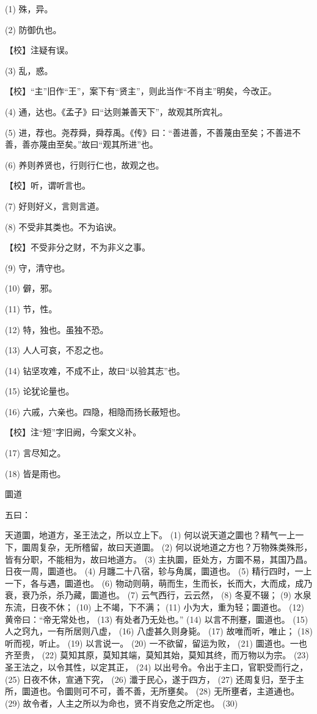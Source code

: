 \documentclass[12pt,UTF8]{ctexbook}
\begin{document}
(1) 殊，异。

(2) 防御仇也。

【校】注疑有误。

(3) 乱，惑。

【校】“主”旧作“王”，案下有“贤主”，则此当作“不肖主”明矣，今改正。

(4) 通，达也。《孟子》曰“达则兼善天下”，故观其所宾礼。

(5) 进，荐也。尧荐舜，舜荐禹。《传》曰：“善进善，不善蔑由至矣；不善进不善，善亦蔑由至矣。”故曰“观其所进”也。

(6) 养则养贤也，行则行仁也，故观之也。

【校】听，谓听言也。

(7) 好则好义，言则言道。

(8) 不受非其类也。不为谄谀。

【校】不受非分之财，不为非义之事。

(9) 守，清守也。

(10) 僻，邪。

(11) 节，性。

(12) 特，独也。虽独不恐。

(13) 人人可哀，不忍之也。

(14) 钻坚攻难，不成不止，故曰“以验其志”也。

(15) 论犹论量也。

(16) 六戚，六亲也。四隐，相隐而扬长蔽短也。

【校】注“短”字旧阙，今案文义补。

(17) 言尽知之。

(18) 皆是雨也。





圜道


五曰：

天道圜，地道方，圣王法之，所以立上下。 (1) 何以说天道之圜也？精气一上一下，圜周复杂，无所稽留，故曰天道圜。 (2) 何以说地道之方也？万物殊类殊形，皆有分职，不能相为，故曰地道方。 (3) 主执圜，臣处方，方圜不易，其国乃昌。日夜一周，圜道也。 (4) 月躔二十八宿，轸与角属，圜道也。 (5) 精行四时，一上一下，各与遇，圜道也。 (6) 物动则萌，萌而生，生而长，长而大，大而成，成乃衰，衰乃杀，杀乃藏，圜道也。 (7) 云气西行，云云然， (8) 冬夏不辍； (9) 水泉东流，日夜不休； (10) 上不竭，下不满； (11) 小为大，重为轻；圜道也。 (12) 黄帝曰：“帝无常处也， (13) 有处者乃无处也。” (14) 以言不刑蹇，圜道也。 (15) 人之窍九，一有所居则八虚， (16) 八虚甚久则身毙。 (17) 故唯而听，唯止； (18) 听而视，听止。 (19) 以言说一。 (20) 一不欲留，留运为败， (21) 圜道也。一也齐至贵， (22) 莫知其原，莫知其端，莫知其始，莫知其终，而万物以为宗。 (23) 圣王法之，以令其性，以定其正， (24) 以出号令。令出于主口，官职受而行之， (25) 日夜不休，宣通下究， (26) 瀸于民心，遂于四方， (27) 还周复归，至于主所，圜道也。令圜则可不可，善不善，无所壅矣。 (28) 无所壅者，主道通也。 (29) 故令者，人主之所以为命也，贤不肖安危之所定也。 (30)
\end{document}
